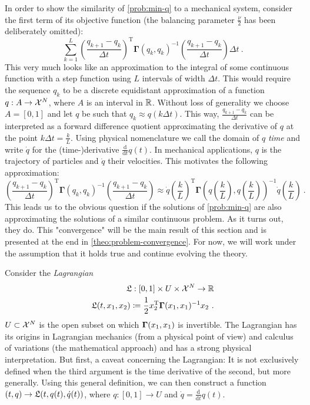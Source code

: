In order to show the similarity of \cref{prob:min-q} to a mechanical system, consider the first term of its objective function (the balancing parameter $\frac{\nu}{2}$ has been deliberately omitted):
\begin{equation}
	\label{eq:discrete-lagrangian}
	\sum_{k=1}^{L} \left(\frac{q_{k+1} - q_k}{\Delta t}\right)^\mathrm{T} \mathbf{\Gamma}(q_k, q_k)^{-1} \left(\frac{q_{k+1} - q_k}{\Delta t}\right) \Delta t \ .
\end{equation}
This very much looks like an approximation to the integral of some continuous function with a step function using $L$ intervals of width $\Delta t$.
This would require the sequence $q_k$ to be a discrete equidistant approximation of a function $q: A \rightarrow \mathcal{X}^N$, where $A$ is an interval in $\mathbb{R}$.
Without loss of generality we choose $A = [0, 1]$ and let $q$ be such that $q_k \approx q(k \Delta t)$.
This way, $\frac{q_{k+1} - q_k}{\Delta t}$ can be interpreted as a forward difference quotient approximating the derivative of $q$ at the point $k \Delta t = \frac{k}{L}$.
Using physical nomenclature we call the domain of $q$ \emph{time} and write $\dot{q}$ for the (time-)derivative $\frac{\mathrm{d}}{\mathrm{d}t}q(t)$.
In mechanical applications, $q$ is the trajectory of particles and $\dot{q}$ their velocities.
This motivates the following approximation:
\begin{equation}
	\left(\frac{q_{k+1} - q_k}{\Delta t}\right)^\mathrm{T} \mathbf{\Gamma}(q_k, q_k)^{-1} \left(\frac{q_{k+1} - q_k}{\Delta t}\right)
	\approx \dot{q}\left(\frac{k}{L}\right)^\mathrm{T} \mathbf{\Gamma}\left(q\left(\frac{k}{L}\right), q\left(\frac{k}{L}\right)\right)^{-1}\dot{q}\left(\frac{k}{L}\right) \ .
\end{equation}
This leads us to the obvious question if the solutions of \cref{prob:min-q} are also approximating the solutions of a similar continuous problem.
As it turns out, they do.
This "convergence" will be the main result of this section and is presented at the end in \cref{theo:problem-convergence}.
For now, we will work under the assumption that it holds true and continue evolving the theory.

Consider the \emph{Lagrangian}
\begin{equation}
\label{eq:lagrangian}
\begin{split}
\mathfrak{L}: [0, 1] \times U \times \mathcal{X}^N \rightarrow \mathbb{R}\\ 
\mathfrak{L}(t, x_1, x_2) \coloneqq \frac{1}{2}  x_2^\mathrm{T} \mathbf{\Gamma}(x_1, x_1)^{-1} x_2 \ .
\end{split}
\end{equation}
$U \subset \mathcal{X}^N$ is the open subset on which $\mathbf{\Gamma}(x_1, x_1)$ is invertible.
The Lagrangian has its origins in Lagrangian mechanics (from a physical point of view) and calculus of variations (the mathematical approach) and has a strong physical interpretation.
But first, a caveat concerning the Lagrangian:
It is not exclusively defined when the third argument is the time derivative of the second, but more generally.
Using this general definition, we can then construct a function $(t, q) \rightarrow \mathfrak{L}(t, q(t), \dot{q}(t))$, where $q: [0, 1] \rightarrow U$ and $\dot{q} = \frac{\mathrm{d}}{\mathrm{d}t}q(t)$.

